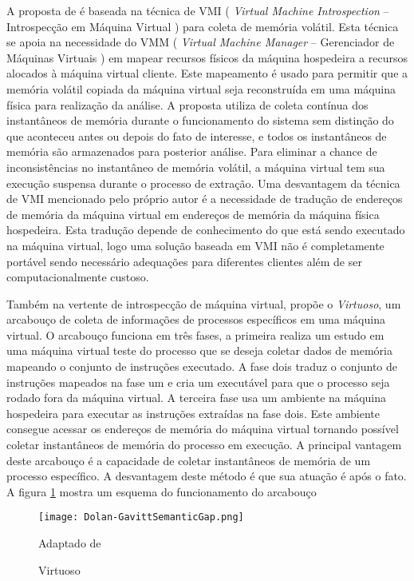 A proposta de \cite{PoiselVMI:2013} é baseada na técnica de VMI ( \textit{Virtual Machine Introspection} -- Introspecção em Máquina Virtual ) para coleta de memória volátil. 
%
Esta técnica se apoia na necessidade do VMM ( \textit{Virtual Machine Manager} -- Gerenciador de Máquinas Virtuais ) em mapear recursos físicos da máquina hospedeira a recursos alocados à máquina virtual cliente.
%
Este mapeamento é usado para permitir que a memória volátil copiada da máquina virtual seja reconstruída em uma máquina física para realização da análise.
%
A proposta utiliza de coleta contínua dos instantâneos de memória durante o funcionamento do sistema sem distinção do que aconteceu antes ou depois do fato de interesse, e todos os instantâneos de memória são armazenados para posterior análise.
%
Para eliminar a chance de inconsistências no instantâneo de memória volátil, a máquina virtual tem sua execução suspensa durante o processo de extração.
%
Uma desvantagem da técnica de VMI mencionado pelo próprio autor é a necessidade de tradução de endereços de memória da máquina virtual em endereços de memória da máquina física hospedeira.
%
Esta tradução depende de conhecimento do que está sendo executado na máquina virtual, logo uma solução baseada em VMI não é completamente portável sendo necessário adequações para diferentes clientes além de ser computacionalmente custoso.
%

Também na vertente de introspecção de máquina virtual, \cite{Dolan-GavittSemanticGap:2011} propõe o \textit{Virtuoso}, um arcabouço de coleta de informações de processos específicos em uma máquina virtual.
%
O arcabouço funciona em três fases, a primeira realiza um estudo em uma máquina virtual teste do processo que se deseja coletar dados de memória mapeando o conjunto de instruções executado. 
%
A fase dois traduz o conjunto de instruções mapeados na fase um e cria um executável para que o processo seja rodado fora da máquina virtual.
%
A terceira fase usa um ambiente na máquina hospedeira para executar as instruções extraídas na fase dois. Este ambiente consegue acessar os endereços de memória do máquina virtual tornando possível coletar instantâneos de memória do processo em execução.
%
A principal vantagem deste arcabouço é a capacidade de coletar instantâneos de memória de um processo específico.
%
A desvantagem deste método é que sua atuação é após o fato.
%
A figura \ref{fig:Dolan-GavittSemanticGap} mostra um esquema do funcionamento do arcabouço

\begin{figure}[htb!]
\footnotesize
\caption{Virtuoso}
\texttt{[image: Dolan-GavittSemanticGap.png]}
\centering
\label{fig:Dolan-GavittSemanticGap}
\begin{center}
Adaptado de \cite{Dolan-GavittSemanticGap:2011} 
\end{center}
\end{figure}


